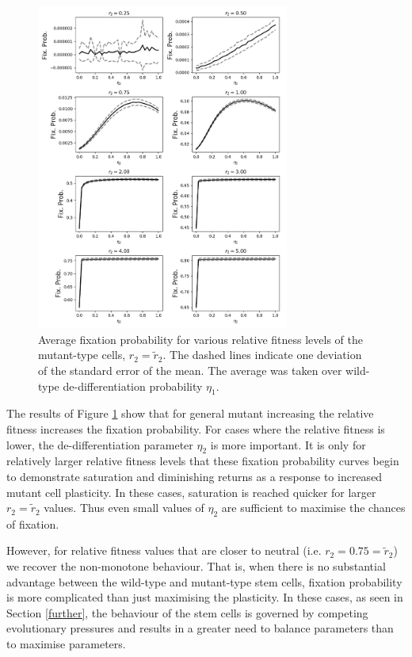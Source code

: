 \documentclass[12pt]{article}
\begin{document}
\begin{figure}[H]
\begin{center}
\includegraphics[width=0.74\textwidth]{avg_eta1_r2_stackplot.png}
\end{center}
\caption{Average fixation probability for various relative fitness levels of the mutant-type cells, $r_2=\tilde{r}_2$. The dashed lines indicate one deviation of the standard error of the mean. The average was taken over wild-type de-differentiation probability $\eta_1$.}\label{r2_stack}
\end{figure}

The results of Figure \ref{r2_stack} show that for general mutant increasing the relative fitness increases the fixation probability. For cases where the relative fitness is lower, the de-differentiation parameter $\eta_2$ is more important. It is only for relatively larger relative fitness levels that  these fixation probability curves begin to demonstrate saturation and diminishing returns as a response to increased mutant cell plasticity.  In these cases, saturation is reached quicker for larger $r_2=\tilde{r}_2$ values. Thus even small values of $\eta_2$ are sufficient to maximise the chances of fixation. 

However, for relative fitness values that are closer to neutral (i.e. $r_2=0.75=\tilde{r}_2$) we recover the non-monotone behaviour. That is, when there is no substantial advantage between the wild-type and mutant-type stem cells, fixation probability is more complicated than just maximising the plasticity. In these cases, as seen in Section \ref{further}, the behaviour of the stem cells is governed by competing evolutionary pressures and results in a greater need to balance parameters than to maximise parameters.
\end{document}

